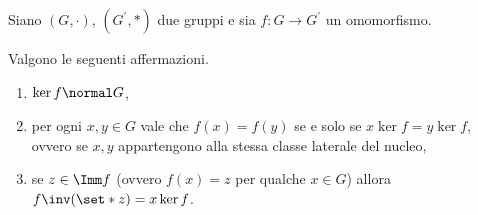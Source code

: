 \begin{proposition}
    \label{prop:rel_kernel_sgr_normali}
    Siano $(G, \cdot)$, $(G^\prime, *)$ due gruppi e sia $f : G \to G^\prime$ un omomorfismo. 
    
    Valgono le seguenti affermazioni.
    \begin{enumerate}[label={(\roman*)}]
        \item $\ker f \normal G$,
        \item per ogni $x, y \in G$ vale che $f(x) = f(y)$ se e solo se $x\ker f = y\ker f$, ovvero se $x, y$ appartengono alla stessa classe laterale del nucleo,
        \item se $z \in \Imm f$ (ovvero $f(x) = z$ per qualche $x \in G$) allora $f\inv(\set*{z}) = x\ker f$.
    \end{enumerate}
\end{proposition}
